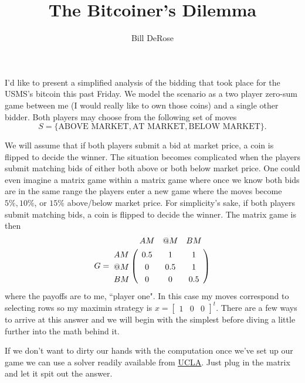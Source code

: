 \documentclass[11pt, oneside]{article}     %
\title{The Bitcoiner's Dilemma}
\author{Bill DeRose}
\begin{document}

\maketitle
I'd like to present a simplified analysis of the bidding that took place for the 
USMS's bitcoin this past Friday. We model the scenario as a two player
zero-sum game between me (I would really like to own those coins) 
and a single other bidder. Both players may choose from the following set of 
moves $$S =\{\mbox{ABOVE MARKET}, \mbox{AT MARKET}, \mbox{BELOW MARKET}\}.$$

We will assume that if both players submit a bid at market price, a coin
is flipped to decide the winner. The situation becomes complicated when the 
players submit matching bids of either both above or both below market price.
One could even imagine a matrix game within a matrix
game where once we know both bids are in the same range the players enter a new
game where the moves become $5\%, 10\%$, or $15\%$ above/below market price.
For simplicity's sake, if both players submit matching bids, a coin
is flipped to decide the winner.
The matrix game is then 
\begin{align*}
G = \bordermatrix{
      &   AM & @M & BM\cr
      AM & 0.5 & 1 & 1\cr
    	@M & 0 & 0.5 & 1\cr
			BM & 0 & 0 & 0.5\cr}
\end{align*}
where the payoffs are to me, ``player one". In this case my moves correspond to 
selecting rows so 
my maximin strategy is $x = \begin{bmatrix}1 & 0 & 0 \end{bmatrix}^t$. 
There are a few ways to arrive at this answer and we will begin with
the simplest before diving a little further into the math behind it.


If we don't want to dirty our hands with the computation once we've set
up our game we can use a solver readily available from
\href{http://www.math.ucla.edu/~tom/gamesolve.html}{\uline{UCLA}}. Just plug in the
matrix and let it spit out the answer.
\end{document}
